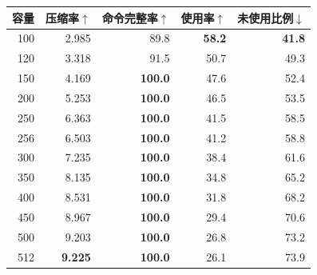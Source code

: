 \begin{tabular*}{\linewidth}{@{\extracolsep{\fill}}rrrrr@{}}
\toprule
容量 & 压缩率$\uparrow$ & 命令完整率$\uparrow$ & 使用率$\uparrow$ & 未使用比例$\downarrow$\\
\midrule
100 & 2.985 & 89.8 & \textbf{58.2} & \textbf{41.8}\\
120 & 3.318 & 91.5 & 50.7 & 49.3\\
150 & 4.169 & \textbf{100.0} & 47.6 & 52.4\\
200 & 5.253 & \textbf{100.0} & 46.5 & 53.5\\
250 & 6.363 & \textbf{100.0} & 41.5 & 58.5\\
256 & 6.503 & \textbf{100.0} & 41.2 & 58.8\\
300 & 7.235 & \textbf{100.0} & 38.4 & 61.6\\
350 & 8.135 & \textbf{100.0} & 34.8 & 65.2\\
400 & 8.531 & \textbf{100.0} & 31.8 & 68.2\\
450 & 8.967 & \textbf{100.0} & 29.4 & 70.6\\
500 & 9.203 & \textbf{100.0} & 26.8 & 73.2\\
512 & \textbf{9.225} & \textbf{100.0} & 26.1 & 73.9\\
\bottomrule
\end{tabular*}